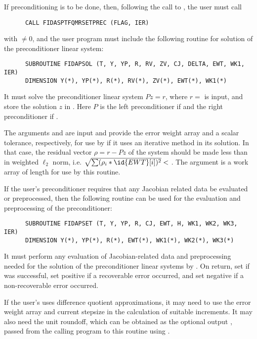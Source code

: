 \begin{Steps}
  If preconditioning is to be done, then, following the
  call to , the user must call
\begin{verbatim}
      CALL FIDASPTFQMRSETPREC (FLAG, IER)
\end{verbatim}
  with  $\neq 0$, and the user program must include the following routine
  for solution of the preconditioner linear system:
\begin{verbatim}
      SUBROUTINE FIDAPSOL (T, Y, YP, R, RV, ZV, CJ, DELTA, EWT, WK1, IER)
      DIMENSION Y(*), YP(*), R(*), RV(*), ZV(*), EWT(*), WK1(*)
\end{verbatim}
  It must solve the preconditioner linear system $Pz = r$, where $r =$  
  is input, and store the solution $z$ in . Here $P$ is the left 
  preconditioner if  and the right preconditioner if .
  
  The arguments  and  are input and provide the error weight
  array and a scalar tolerance, respectively, for use by  if it uses
  an iterative method in its solution.  In that case, the residual vector
  $\rho = r - Pz$ of the system should be made less than  in weighted
  $\ell_2$ norm, i.e. $\sqrt{\sum(\rho_i * \id{EWT}[i])^2} < $ .
  The argument  is a work array of length  for use by this
  routine.

  If the user's preconditioner requires that any Jacobian related data be evaluated
  or preprocessed, then the following routine can be used for the evaluation and 
  preprocessing of the preconditioner:
\begin{verbatim}
      SUBROUTINE FIDAPSET (T, Y, YP, R, CJ, EWT, H, WK1, WK2, WK3, IER)
      DIMENSION Y(*), YP(*), R(*), EWT(*), WK1(*), WK2(*), WK3(*) 
\end{verbatim}
  It must perform any evaluation of Jacobian-related data and preprocessing needed
  for the solution of the preconditioner linear systems by .
  On return, set  if  was successful, set 
  positive if a recoverable error occurred, and set  negative if a 
  non-recoverable error occurred.
  
  If the user's  uses difference quotient approximations, it
  may need to use the error weight array  and current stepsize 
  in the calculation of suitable increments.  It may also need the unit
  roundoff, which can be obtained as the optional output ,
  passed from the calling program to this routine using .


\end{Steps}
